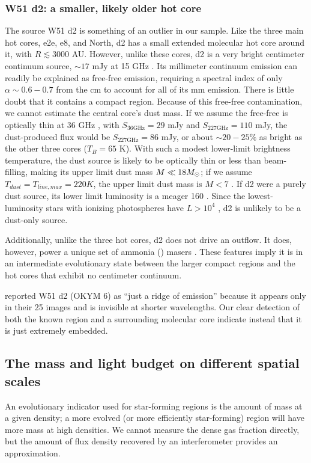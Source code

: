 \documentclass{emulateapj}
\begin{document}
\subsubsection{W51 d2: a smaller, likely older hot core}
\label{sec:w51d2}
The source W51 d2 is something of an outlier in our sample.  Like the three
main hot cores, e2e, e8, and North, d2 has a small extended molecular hot core
around it, with $R\lesssim3000$ AU.  However, unlike these cores, d2 is a very
bright centimeter continuum source, $\sim17$ mJy at 15 GHz
\citep{Ginsburg2016a}.  Its millimeter continuum emission can readily be
explained as free-free emission, requiring a spectral index of only
$\alpha\sim0.6-0.7$ from the cm to account for all of its mm emission.  There
is little doubt that it contains a compact \hii region.  Because of this free-free
contamination, we cannot estimate the central core's dust mass.  If we assume
the free-free is optically thin at 36 GHz \citep[the highest-frequency cm-wave
measurement
we have available][]{Goddi2015a}, with $S_{36 \mathrm{GHz}} = 29$ mJy and
$S_{227 \mathrm{GHz}}=110$
mJy, the dust-produced flux would be $S_{227 \mathrm{GHz}} = 86$ mJy, or about
$\sim20-25\%$ as bright as the other three cores ($T_{B}=65$ K).  With such a modest
lower-limit brightness temperature, the dust source is likely to be optically
thin or less than beam-filling, making its upper limit dust mass 
$M\ll18M_{\odot}$; if we assume $T_{dust} = T_{line,max} = 220 K$, the upper limit
dust mass is $M<7$ \msun.  If d2 were a purely dust source, its lower limit
luminosity is a meager 160 \lsun.  Since the lowest-luminosity 
stars with ionizing photospheres have $L>10^4$ \lsun, d2 is unlikely to be a
dust-only source.

Additionally, unlike the three hot cores, d2 does not drive an outflow.  It
does, however, power a unique set of ammonia (\ammonia) masers \citep[][Wootten
\& Wilson in prep]{Gaume1993a,Wilson1990a,Zhang1995a,Henkel2013a,Goddi2015a}.  These
features imply it is in an intermediate evolutionary state between the larger
compact \hii regions and the hot cores that exhibit no centimeter continuum.

\citet{Barbosa2016a} reported W51 d2 (OKYM 6) as ``just a ridge of emission''
because it appears only in their 25 \um images and is invisible at shorter
wavelengths.  Our clear detection of both the known \hchii region and a
surrounding molecular core indicate instead that it is just extremely embedded.


\subsection{The mass and light budget on different spatial scales}
\label{sec:massbudget}
An evolutionary indicator used for star-forming regions is the amount of mass
at a given density; a more evolved (or more efficiently star-forming) region will
have more mass at high densities.  We cannot measure the dense gas fraction
directly, but the amount of flux density recovered by an interferometer
provides an approximation.
\end{document}
